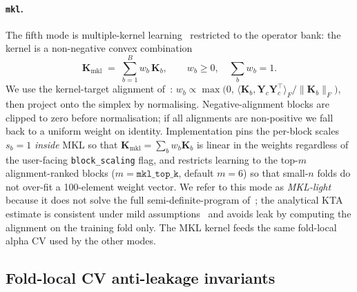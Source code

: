 \documentclass[11pt,a4paper]{article}
\newcommand{\Yc}{\mathbf{Y}_{\!c}}
\newcommand{\Kmat}{\mathbf{K}}
\begin{document}
\paragraph{\texttt{mkl}.}
The fifth mode is multiple-kernel learning~\citep{lanckriet2004learning,
bach2008consistency, gonen2011multiple} restricted to the operator
bank: the kernel is a non-negative convex combination
\begin{equation}
\Kmat_{\mathrm{mkl}} \;=\; \sum_{b=1}^B w_b\,\Kmat_b,
\qquad
w_b \geq 0,\quad \sum_b w_b = 1.
\label{eq:mkl-kernel}
\end{equation}
We use the kernel-target alignment of~\citet{cristianini2002kernel}:
$w_b\propto\max\!\big(0,\,
\langle\Kmat_b,\Yc\Yc^\top\rangle_F/\|\Kmat_b\|_F\big)$, then project
onto the simplex by normalising. Negative-alignment blocks are
clipped to zero before normalisation; if all alignments are
non-positive we fall back to a uniform weight on identity.
Implementation pins the per-block scales $s_b=1$ \emph{inside} MKL so
that $\Kmat_{\mathrm{mkl}}=\sum_b w_b\Kmat_b$ is linear in the
weights regardless of the user-facing \texttt{block\_scaling} flag,
and restricts learning to the top-$m$ alignment-ranked blocks
($m=\texttt{mkl\_top\_k}$, default $m=6$) so that small-$n$ folds do
not over-fit a 100-element weight vector. We refer to this mode as
\emph{MKL-light} because it does not solve the full
semi-definite-program of~\citet{lanckriet2004learning}; the
analytical KTA estimate is consistent under mild
assumptions~\citep{cristianini2002kernel} and avoids leak by
computing the alignment on the training fold only. The MKL kernel
feeds the same fold-local alpha CV used by the other modes.

\subsection{Fold-local CV anti-leakage invariants}\label{sec:method-foldlocal}
\end{document}
